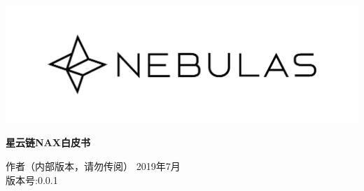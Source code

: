 \documentclass[12pt]{article}
\begin{document}
\pagestyle{empty}
\renewcommand{\contentsname}{目录}
\renewcommand{\abstractname}{摘要}
\renewcommand{\refname}{参考文献}
\renewcommand{\figurename}{图}
\renewcommand{\tablename}{表}
\renewcommand{\baselinestretch}{1.5}
\renewcommand{\appendixname}{附录}
\renewcommand{\proofname}{证明}


\begin{titlepage}
  \begin{center}
    \vspace*{5.5cm}
    \includegraphics[scale=0.4]{../common/Nebulas.png}
    \vspace{0.5cm}


    \textbf{\huge{星云链NAX白皮书}}

    \vspace{0.5cm}
    作者（内部版本，请勿传阅）
    \vfill
    2019年7月 \\
    版本号:0.0.1
    \textbf{}
  \end{center}

\end{titlepage}
\setcounter{page}{0}
\tableofcontents
\newpage
\setcounter{page}{1}
\pagestyle{fancy}
\vspace*{0.01cm}






\newpage


\newpage 
\begin{appendices}
%
%

\end{appendices}
\end{document}
